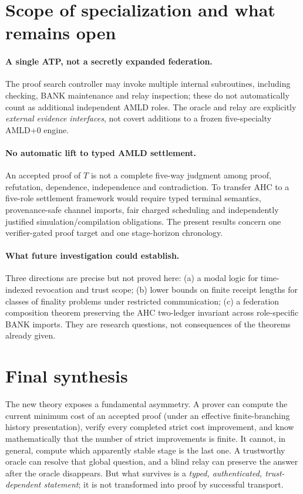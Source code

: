 \documentclass[11pt,letterpaper]{article}
\theoremstyle{definition}
\theoremstyle{remark}
\begin{document}
\section{Scope of specialization and what remains open}
\paragraph{A single ATP, not a secretly expanded federation.}
The proof search controller may invoke multiple internal subroutines, including checking, BANK maintenance and relay inspection; these do not automatically count as additional independent AMLD roles. The oracle and relay are explicitly \emph{external evidence interfaces}, not covert additions to a frozen five-specialty AMLD+0 engine.

\paragraph{No automatic lift to typed AMLD settlement.}
An accepted proof of $T$ is not a complete five-way judgment among proof, refutation, dependence, independence and contradiction. To transfer AHC to a five-role settlement framework would require typed terminal semantics, provenance-safe channel imports, fair charged scheduling and independently justified simulation/compilation obligations. The present results concern one verifier-gated proof target and one stage-horizon chronology.

\paragraph{What future investigation could establish.}
Three directions are precise but not proved here: (a) a modal logic for time-indexed revocation and trust scope; (b) lower bounds on finite receipt lengths for classes of finality problems under restricted communication; (c) a federation composition theorem preserving the AHC two-ledger invariant across role-specific BANK imports. They are research questions, not consequences of the theorems already given.

\section{Final synthesis}
The new theory exposes a fundamental asymmetry. A prover can compute the current minimum cost of an accepted proof (under an effective finite-branching history presentation), verify every completed strict cost improvement, and know mathematically that the number of strict improvements is finite. It cannot, in general, compute which apparently stable stage is the last one. A trustworthy oracle can resolve that global question, and a blind relay can preserve the answer after the oracle disappears. But what survives is a \emph{typed, authenticated, trust-dependent statement}; it is not transformed into proof by successful transport.
\end{document}
